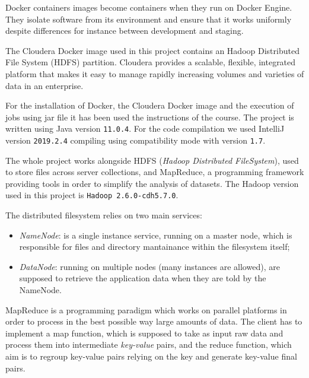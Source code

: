 \documentclass[a4paper]{article}
\begin{document}
		\bigskip

		\noindent
		Docker containers images become containers when they run on Docker Engine. They isolate software from its environment and ensure that it works uniformly despite differences for instance between development and staging.
		
		\bigskip

		\noindent
		The Cloudera\parencite{Cloudera} Docker image used in this project contains an Hadoop Distributed File System (HDFS) partition. Cloudera provides a scalable, flexible, integrated platform that makes it easy to manage rapidly increasing volumes and varieties of data in an enterprise. 

		\bigskip

		\noindent
		For the installation of Docker, the Cloudera Docker image and the execution of jobs using jar file it has been used the instructions of the course. The project is written using Java version \texttt{11.0.4}. For the code compilation we used IntelliJ version \texttt{2019.2.4} compiling using compatibility mode with version \texttt{1.7}.
		
		\bigskip
		
		\noindent
		The whole project works alongside HDFS (\textit{Hadoop Distributed FileSystem}), used to store files across server collections, and MapReduce, a programming framework providing tools in order to simplify the analysis of datasets. The Hadoop version used in this project is \texttt{Hadoop 2.6.0-cdh5.7.0}.
		
		The distributed filesystem relies on two main services: \begin{itemize}
			\item \textit{NameNode}: is a single instance service, running on a master node, which is responsible for files and directory mantainance within the filesystem itself;
			
			\item \textit{DataNode}: running on multiple nodes (many instances are allowed), are supposed to retrieve the application data when they are told by the NameNode.
		\end{itemize}
	
		MapReduce is a programming paradigm which works on parallel platforms in order to process in the best possible way large amounts of data. The client has to implement a map function, which is supposed to take as input raw data and process them into intermediate \textit{key-value} pairs, and the reduce function, which aim is to regroup key-value pairs relying on the key and generate key-value final pairs.
\end{document}

